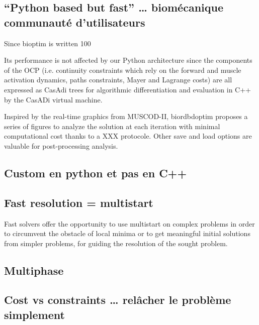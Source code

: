  

\subsection{“Python based but fast” … biomécanique communauté d’utilisateurs}

Since bioptim is written 100%

Its performance is not affected by our Python architecture since the components of the OCP (i.e. continuity constraints which rely on the forward and muscle activation dynamics, paths constraints, Mayer and Lagrange costs) are all expressed as CasAdi trees for algorithmic differentiation and evaluation in C++ by the CasADi virtual machine.  

Inspired by the  real-time graphics from MUSCOD-II, biordbdoptim proposes a series of figures to analyze the solution at each iteration with  minimal computational cost thanks to a XXX protocole. Other save and load options are valuable for post-processing analysis.

\subsection{Custom en python et pas en C++}

\subsection{Fast resolution = multistart}
Fast solvers offer the opportunity to use multistart on complex problems in order to circumvent the obstacle of local minima \cite{huchez2015local, bailly2020optimal} or to get meaningful initial solutions from simpler problems, for guiding the resolution of the sought problem.


\subsection{Multiphase}

\subsection{Cost vs constraints … relâcher le problème simplement}

